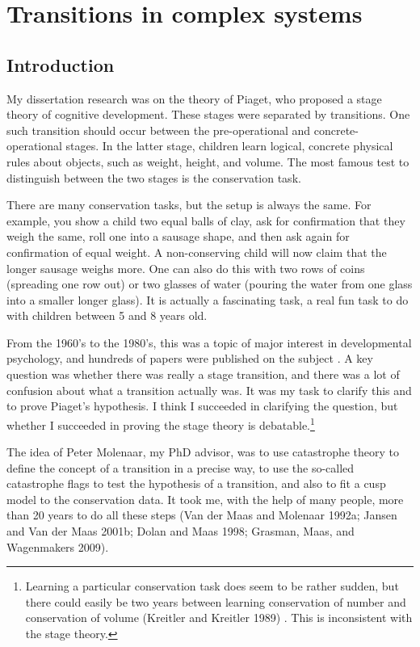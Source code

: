 \documentclass[
  a4paper,
  DIV=11,
  numbers=noendperiod]{scrreprt}
\begin{document}

\hypertarget{sec-ch3}{%
\chapter{Transitions in complex systems}\label{sec-ch3}}

\hypertarget{sec-Introduction}{%
\section{Introduction}\label{sec-Introduction}}

My dissertation research was on the theory of Piaget, who proposed a
stage theory of cognitive development. These stages were separated by
transitions. One such transition should occur between the
pre-operational and concrete-operational stages. In the latter stage,
children learn logical, concrete physical rules about objects, such as
weight, height, and volume. The most famous test to distinguish between
the two stages is the conservation task.

There are many conservation tasks, but the setup is always the same. For
example, you show a child two equal balls of clay, ask for confirmation
that they weigh the same, roll one into a sausage shape, and then ask
again for confirmation of equal weight. A non-conserving child will now
claim that the longer sausage weighs more. One can also do this with two
rows of coins (spreading one row out) or two glasses of water (pouring
the water from one glass into a smaller longer glass). It is actually a
fascinating task, a real fun task to do with children between 5 and 8
years old.

From the 1960's to the 1980's, this was a topic of major interest in
developmental psychology, and hundreds of papers were published on the
subject . A key question was whether there was really a stage
transition, and there was a lot of confusion about what a transition
actually was. It was my task to clarify this and to prove Piaget's
hypothesis. I think I succeeded in clarifying the question, but whether
I succeeded in proving the stage theory is debatable.\footnote{Learning
  a particular conservation task does seem to be rather sudden, but
  there could easily be two years between learning conservation of
  number and conservation of volume (Kreitler and Kreitler 1989) . This
  is inconsistent with the stage theory.}

The idea of Peter Molenaar, my PhD advisor, was to use catastrophe
theory to define the concept of a transition in a precise way, to use
the so-called catastrophe flags to test the hypothesis of a transition,
and also to fit a cusp model to the conservation data. It took me, with
the help of many people, more than 20 years to do all these steps (Van
der Maas and Molenaar 1992a; Jansen and Van der Maas 2001b; Dolan and
Maas 1998; Grasman, Maas, and Wagenmakers 2009).
\end{document}
